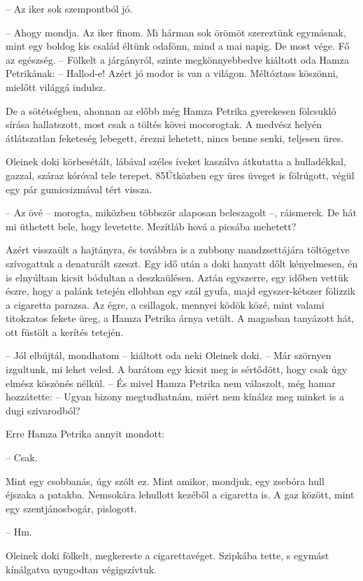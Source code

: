 \documentclass{IEEEtran}
\begin{document}
– Az iker sok szempontból jó.

– Ahogy mondja. Az iker finom. Mi hárman sok örömöt szereztünk egymásnak, mint
egy boldog kis család éltünk odafönn, mind a mai napig. De most vége. Fő az
egészség. – Fölkelt a járgányról, szinte megkönnyebbedve kiáltott oda Hamza
Petrikának: – Hallod-e! Azért jó modor is van a világon. Méltóztass köszönni,
mielőtt világgá indulsz.

De a sötétségben, ahonnan az előbb még Hamza Petrika gyerekesen fölcsukló
sírása hallatszott, most csak a töltés kövei mocorogtak. A medvész helyén
átlátszatlan feketeség lebegett, érezni lehetett, nincs benne senki, teljesen
üres.

Oleinek doki körbesétált, lábával széles íveket kaszálva átkutatta a
hulladékkal, gazzal, száraz kóróval tele terepet. 85Útközben egy üres üveget
is fölrúgott, végül egy pár gumicsizmával tért vissza.

– Az övé – morogta, miközben többször alaposan beleszagolt –, ráismerek. De
hát mi üthetett bele, hogy levetette. Mezítláb hová a picsába mehetett?

Azért visszaült a hajtányra, és továbbra is a zubbony mandzsettájára
töltögetve szívogattuk a denaturált szeszt. Egy idő után a doki hanyatt dőlt
kényelmesen, én is elnyúltam kicsit bódultan a deszkaülésen. Aztán egyszerre,
egy időben vettük észre, hogy a palánk tetején ellobban egy szál gyufa, majd
egyszer-kétszer fölizzik a cigaretta parazsa. Az égre, a csillagok, mennyei
ködök közé, mint valami titokzatos fekete üreg, a Hamza Petrika árnya vetült.
A magasban tanyázott hát, ott füstölt a kerítés tetején.

– Jól elbújtál, mondhatom – kiáltott oda neki Oleinek doki. – Már szörnyen
izgultunk, mi lehet veled. A barátom egy kicsit meg is sértődött, hogy csak
úgy elmész köszönés nélkül. – És mivel Hamza Petrika nem válaszolt, még hamar
hozzátette: – Ugyan bizony megtudhatnám, miért nem kínálsz meg minket is a
dugi szivarodból?

Erre Hamza Petrika annyit mondott:

– Csak.

Mint egy csobbanás, úgy szólt ez. Mint amikor, mondjuk, egy zsebóra hull
éjszaka a patakba. Nemsokára lehullott kezéből a cigaretta is. A gaz között,
mint egy szentjánosbogár, pislogott.

– Hm.

Oleinek doki fölkelt, megkereste a cigarettavéget. Szipkába tette, s egymást
kínálgatva nyugodtan végigszívtuk.
\end{document}
